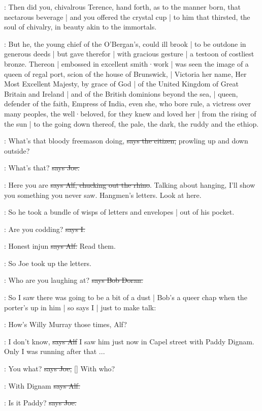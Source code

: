 :
Then did you,
chivalrous Terence,
hand forth,
as to the manner born,
that nectarous beverage |
and you offered the crystal cup |
to him that thirsted,
the soul of chivalry,
in beauty akin to the immortals.

:
But he,
the young chief of the O'Bergan's,
could ill brook |
to be outdone in generous deeds |
but gave therefor |
with gracious gesture |
a testoon of costliest bronze.
Thereon |
embossed in excellent smith·work |
was seen the image of a queen of regal port,
scion of the house of Brunswick, |
Victoria her name,
Her Most Excellent Majesty,
by grace of God |
of the United Kingdom of Great Britain and Ireland |
and of the British dominions beyond the sea, |
queen,
defender of the faith,
Empress of India,
even she,
who bore rule,
a victress over many peoples,
the well·beloved,
for they knew and loved her |
from the rising of the sun |
to the going down thereof,
the pale,
the dark,
the ruddy and the ethiop.

\citizen:
What's that bloody freemason doing,
\sout{says the citizen,}
prowling up and down outside?

\joe:
What's that?
\sout{says Joe.}

\bergan:
Here you are
\sout{says Alf,
chucking out the rhino}.
Talking about hanging,
I'll show you something you never saw.
Hangmen's letters.
Look at here.

\Nq:
So he took a bundle of wisps of letters and envelopes |
out of his pocket.

:
Are you codding?
\sout{says I.}

\bergan:
Honest injun
\sout{says Alf.}
Read them.

\Nq:
So Joe took up the letters.

\doran:
Who are you laughing at?
\sout{says Bob Doran.}

\Nq:
So I saw there was going to be a bit of a dust |
Bob's a queer chap when the porter's up in him |
so says I |
just to make talk:

:
How's Willy Murray those times,
Alf?

\bergan:
I don't know,
\sout{says Alf}
I saw him just now in Capel street with Paddy Dignam.
Only I was running after that ...

\joe:
You what?
\sout{says Joe,}
[]
With who?

\bergan:
With Dignam
\sout{says Alf.}

\joe:
Is it Paddy?
\sout{says Joe.}

